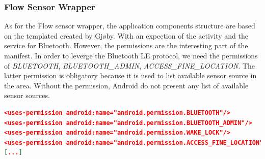 \subsubsection{Flow Sensor Wrapper}

As for the Flow sensor wrapper, the application components structure are based on the templated created by Gjøby. With an expection of the activity and the service for Bluetooth. However, the permissions are the interesting part of the manifest. In order to leverge the Bluetooth LE protocol, we need the permissions of \textit{BLUETOOTH}, \textit{BLUETOOTH\_ADMIN}, \textit{ACCESS\_FINE\_LOCATION}. The latter permission is obligatory because it is used to list available sensor source in the area. Without the permission, Android do not present any list of available sensor sources. 

\begin{lstlisting}[language=json, caption={My Caption}, captionpos=b]
<uses-permission android:name="android.permission.BLUETOOTH"/>
<uses-permission android:name="android.permission.BLUETOOTH_ADMIN"/>
<uses-permission android:name="android.permission.WAKE_LOCK"/>
<uses-permission android:name="android.permission.ACCESS_FINE_LOCATION"/>
[...]
\end{lstlisting}


